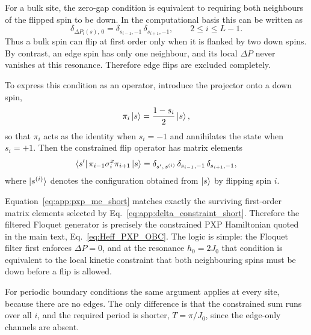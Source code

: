 \documentclass[aps,prb,reprint,twocolumn,amsmath,amssymb,citeautoscript]{revtex4-2}
\begin{document}
For a bulk site, the zero-gap condition is equivalent to requiring both
neighbours of the flipped spin to be down. In the computational basis this
can be written as
\begin{equation}
\delta_{\Delta P_i(s),\,0}
=
\delta_{s_{i-1},-1}\,\delta_{s_{i+1},-1},
\qquad 2\le i\le L-1.
\label{eq:app:delta_constraint_short}
\end{equation}
Thus a bulk spin can flip at first order only when it is flanked by two
down spins. By contrast, an edge spin has only one neighbour, and its
local $\Delta P$ never vanishes at this resonance. Therefore edge flips
are excluded completely.

To express this condition as an operator, introduce the projector onto a
down spin,
\begin{equation}
\pi_i\ket{s}
=
\frac{1-s_i}{2}\ket{s},
\label{eq:app:pi_action_short}
\end{equation}
so that \(\pi_i\) acts as the identity when \(s_i=-1\) and annihilates
the state when \(s_i=+1\). Then the constrained flip operator has matrix
elements
\begin{equation}
\bra{s'}\pi_{i-1}\sigma_i^x\pi_{i+1}\ket{s}
=
\delta_{s',\,s^{(i)}}
\,\delta_{s_{i-1},-1}\,\delta_{s_{i+1},-1},
\label{eq:app:pxp_me_short}
\end{equation}
where \(\ket{s^{(i)}}\) denotes the configuration obtained from
\(\ket{s}\) by flipping spin \(i\).

Equation~\eqref{eq:app:pxp_me_short} matches exactly the surviving
first-order matrix elements selected by
Eq.~\eqref{eq:app:delta_constraint_short}. Therefore the filtered
Floquet generator is precisely the constrained PXP Hamiltonian quoted in
the main text, Eq.~\eqref{eq:Heff_PXP_OBC}. The logic is simple: the
Floquet filter first enforces \(\Delta P=0\), and at the resonance
\(h_0=2J_0\) that condition is equivalent to the local kinetic constraint
that both neighbouring spins must be down before a flip is allowed.

For periodic boundary conditions the same argument applies at every site,
because there are no edges. The only difference is that the constrained
sum runs over all \(i\), and the required period is shorter,
\(T=\pi/J_0\), since the edge-only channels are absent.
\end{document}
